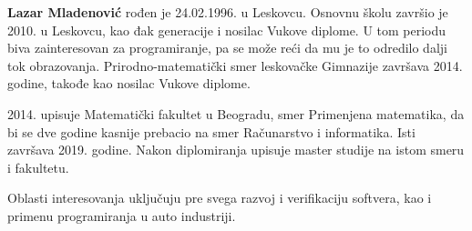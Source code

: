 \documentclass[12pt,oneside]{memoir}
\theoremstyle{plain}
\theoremstyle{definition}
\begin{document}
\backmatter

\begin{biografija}
  \textbf{Lazar Mladenović} rođen je 24.02.1996. u Leskovcu. Osnovnu školu završio je 2010. u Leskovcu, kao đak generacije i nosilac Vukove diplome. U tom periodu biva zainteresovan za programiranje, pa se može reći da mu je to odredilo dalji tok obrazovanja. Prirodno-matematički smer leskovačke Gimnazije završava 2014. godine, takođe kao nosilac Vukove diplome.
  
  2014. upisuje Matematički fakultet u Beogradu, smer Primenjena matematika, da bi se  dve godine kasnije prebacio na smer Računarstvo i informatika. Isti završava 2019. godine. Nakon diplomiranja upisuje master studije na istom smeru i fakultetu. 
  
  Oblasti interesovanja uključuju pre svega razvoj i verifikaciju softvera, kao i primenu programiranja u auto industriji.  
    
\end{biografija}
\end{document}
